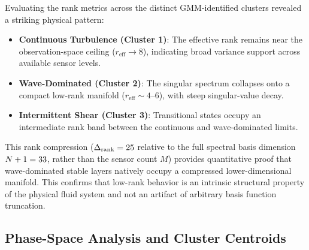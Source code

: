 \documentclass[11pt,a4paper]{article}
\begin{document}
Evaluating the rank metrics across the distinct GMM-identified clusters revealed a striking physical pattern:
\begin{itemize}
  \item \textbf{Continuous Turbulence (Cluster 1)}: The effective rank remains near the observation-space ceiling ($r_{\mathrm{eff}} \rightarrow 8$), indicating broad variance support across available sensor levels.
  \item \textbf{Wave-Dominated (Cluster 2)}: The singular spectrum collapses onto a compact low-rank manifold ($r_{\mathrm{eff}} \sim 4$--$6$), with steep singular-value decay.
  \item \textbf{Intermittent Shear (Cluster 3)}: Transitional states occupy an intermediate rank band between the continuous and wave-dominated limits.
\end{itemize}

This rank compression ($\Delta_{\mathrm{rank}} = 25$ relative to the full spectral basis dimension $N+1=33$, rather than the sensor count $M$) provides quantitative proof that wave-dominated stable layers natively occupy a compressed lower-dimensional manifold. This confirms that low-rank behavior is an intrinsic structural property of the physical fluid system and not an artifact of arbitrary basis function truncation.


\subsection{Phase-Space Analysis and Cluster Centroids}
\label{sec:results:phase_space}
\end{document}
